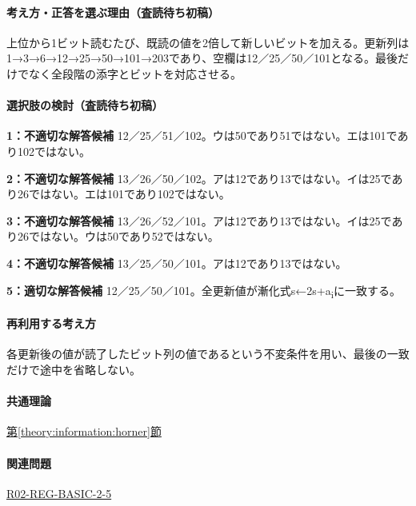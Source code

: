\paragraph{考え方・正答を選ぶ理由（査読待ち初稿）} 上位から1ビット読むたび、既読の値を2倍して新しいビットを加える。更新列は1→3→6→12→25→50→101→203であり、空欄は12／25／50／101となる。最後だけでなく全段階の添字とビットを対応させる。

\paragraph{選択肢の検討（査読待ち初稿）}\mbox{}\par

\noindent\textbf{1：不適切な解答候補} 12／25／51／102。ウは50であり51ではない。エは101であり102ではない。\par

\noindent\textbf{2：不適切な解答候補} 13／26／50／102。アは12であり13ではない。イは25であり26ではない。エは101であり102ではない。\par

\noindent\textbf{3：不適切な解答候補} 13／26／52／101。アは12であり13ではない。イは25であり26ではない。ウは50であり52ではない。\par

\noindent\textbf{4：不適切な解答候補} 13／25／50／101。アは12であり13ではない。\par

\noindent\textbf{5：適切な解答候補} 12／25／50／101。全更新値が漸化式s←2s+a\textsubscript{i}に一致する。\par

\paragraph{再利用する考え方} 各更新後の値が読了したビット列の値であるという不変条件を用い、最後の一致だけで途中を省略しない。

\paragraph{共通理論} \hyperref[theory:information:horner]{第\ref*{theory:information:horner}節}

\paragraph{関連問題} \hyperref[q:r02-reg-basic-2-5]{R02-REG-BASIC-2-5}

